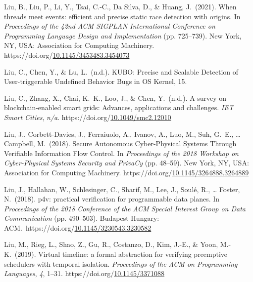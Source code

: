 \documentclass[12pt,twoside]{article}
\begin{document}
{\begin{thebibliography}{1079}
\mdbibitemlabel{}Liu, B., Liu, P., Li, Y., Tsai, C.-C., Da Silva, D., \& Huang, J.~(2021). When threads meet events: efficient and precise static race detection with origins. In \emph{Proceedings of the 42nd ACM SIGPLAN International Conference on Programming Language Design and Implementation} (pp. 725–739). New York, NY, USA: Association for Computing Machinery. https://doi.org/\href{https://dx.doi.org/10.1145/3453483.3454073}{10.1145/3453483.3454073}%

\mdbibitemlabel{}Liu, C., Chen, Y., \& Lu, L.~(n.d.). KUBO: Precise and Scalable Detection of User-triggerable Undeﬁned Behavior Bugs in OS Kernel, 15.%

\mdbibitemlabel{}Liu, C., Zhang, X., Chai, K.~K., Loo, J., \& Chen, Y.~(n.d.). A survey on blockchain-enabled smart grids: Advances, applications and challenges. \emph{IET Smart Cities}, \emph{n/a}. https://doi.org/\href{https://dx.doi.org/10.1049/smc2.12010}{10.1049/smc2.12010}%

\mdbibitemlabel{}Liu, J., Corbett-Davies, J., Ferraiuolo, A., Ivanov, A., Luo, M., Suh, G.~E., … Campbell, M.~(2018). Secure Autonomous Cyber-Physical Systems Through Verifiable Information Flow Control. In \emph{Proceedings of the 2018 Workshop on Cyber-Physical Systems Security and PrivaCy} (pp. 48–59). New York, NY, USA: Association for Computing Machinery. https://doi.org/\href{https://dx.doi.org/10.1145/3264888.3264889}{10.1145/3264888.3264889}%

\mdbibitemlabel{}Liu, J., Hallahan, W., Schlesinger, C., Sharif, M., Lee, J., Soulé, R., … Foster, N.~(2018). p4v: practical verification for programmable data planes. In \emph{Proceedings of the 2018 Conference of the ACM Special Interest Group on Data Communication} (pp. 490–503). Budapest Hungary: ACM.~https://doi.org/\href{https://dx.doi.org/10.1145/3230543.3230582}{10.1145/3230543.3230582}%

\mdbibitemlabel{}Liu, M., Rieg, L., Shao, Z., Gu, R., Costanzo, D., Kim, J.-E., \& Yoon, M.-K.~(2019). Virtual timeline: a formal abstraction for verifying preemptive schedulers with temporal isolation. \emph{Proceedings of the ACM on Programming Languages}, \emph{4}, 1–31. https://doi.org/\href{https://dx.doi.org/10.1145/3371088}{10.1145/3371088}%


\end{thebibliography}}
\end{document}
